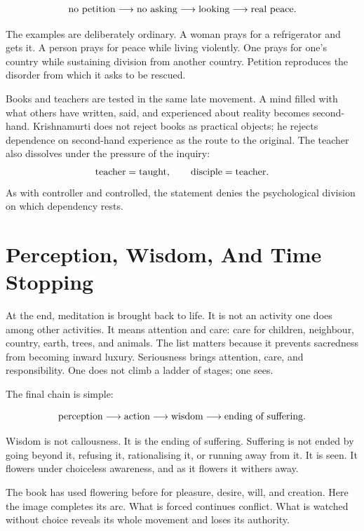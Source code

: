 \documentclass[11pt,oneside]{book}
\begin{document}
\begin{equation}
\hbox{no petition}
\longrightarrow
\hbox{no asking}
\longrightarrow
\hbox{looking}
\longrightarrow
\hbox{real peace}.
\end{equation}

The examples are deliberately ordinary. A woman prays for a refrigerator and gets it. A person prays for peace while living violently. One prays for one's country while sustaining division from another country. Petition reproduces the disorder from which it asks to be rescued.

Books and teachers are tested in the same late movement. A mind filled with what others have written, said, and experienced about reality becomes second-hand. Krishnamurti does not reject books as practical objects; he rejects dependence on second-hand experience as the route to the original. The teacher also dissolves under the pressure of the inquiry:
\begin{equation}
\hbox{teacher}=\hbox{taught},
\qquad
\hbox{disciple}=\hbox{teacher}.
\end{equation}
As with controller and controlled, the statement denies the psychological division on which dependency rests.

\section{Perception, Wisdom, And Time Stopping}

At the end, meditation is brought back to life. It is not an activity one does among other activities. It means attention and care: care for children, neighbour, country, earth, trees, and animals. The list matters because it prevents sacredness from becoming inward luxury. Seriousness brings attention, care, and responsibility. One does not climb a ladder of stages; one sees.

The final chain is simple:

\begin{equation}
\hbox{perception}
\longrightarrow
\hbox{action}
\longrightarrow
\hbox{wisdom}
\longrightarrow
\hbox{ending of suffering}.
\end{equation}

Wisdom is not callousness. It is the ending of suffering. Suffering is not ended by going beyond it, refusing it, rationalising it, or running away from it. It is seen. It flowers under choiceless awareness, and as it flowers it withers away.

The book has used flowering before for pleasure, desire, will, and creation. Here the image completes its arc. What is forced continues conflict. What is watched without choice reveals its whole movement and loses its authority.
\end{document}
